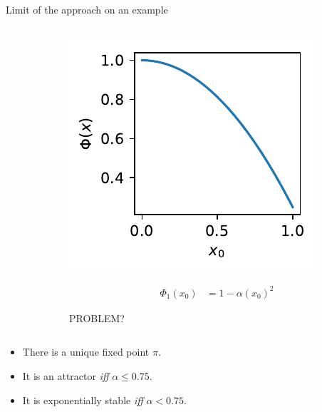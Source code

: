 \documentclass{beamer}
\begin{document}
\begin{frame}{Limit of the approach on an example}
  \begin{columns}
    \begin{column}{.4\linewidth}
    \end{column}
    \begin{column}{0.4\linewidth}
      \centering
      \includegraphics[width=.8\linewidth]{phi_unstable}
      \vspace{-1cm}
      
      \begin{align*}
        \Phi_1(x_0) &= 1-\alpha (x_0)^2
      \end{align*}

      PROBLEM? 
    \end{column}
  \end{columns}
  \bigskip\bigskip
  
  \begin{itemize}
  \item There is a unique fixed point $\pi$. 
  \item It is an attractor \emph{iff} $\alpha\le0.75$. 
  \item It is exponentially stable \emph{iff} $\alpha<0.75$. 
  \end{itemize}
\end{frame}
\end{document}
